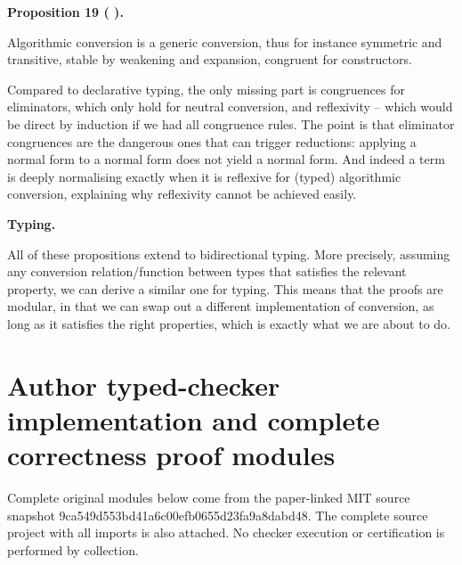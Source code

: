 \documentclass[10pt,a4paper]{amsart}
\begin{document}
 
 
\par\medskip\noindent\textbf{Proposition 19 ( ).}\par
 
 
Algorithmic conversion is a generic conversion, thus for instance symmetric and transitive, stable by weakening and expansion, congruent for constructors.\par
 
 
 
 
Compared to declarative typing, the only missing part is congruences for eliminators, which only hold for neutral conversion, and reflexivity – which would be direct by induction if we had all congruence rules. The point is that eliminator congruences are the dangerous ones that can trigger reductions: applying a normal form to a normal form does not yield a normal form. And indeed a term is deeply normalising exactly when it is reflexive for (typed) algorithmic conversion, explaining why reflexivity cannot be achieved easily.\par
 
 
 
 
\par\medskip\noindent\textbf{Typing.}\par
 
 
All of these propositions extend to bidirectional typing. More precisely, assuming any conversion relation/function between types that satisfies the relevant property, we can derive a similar one for typing. This means that the proofs are modular, in that we can swap out a different implementation of conversion, as long as it satisfies the right properties, which is exactly what we are about to do.\par
 
 
 

\clearpage
\section*{Author typed-checker implementation and complete correctness proof modules}
Complete original modules below come from the paper-linked MIT source snapshot 9ca549d553bd41a6c00efb0655d23fa9a8dabd48. The complete source project with all imports is also attached. No checker execution or certification is performed by collection.
\end{document}
